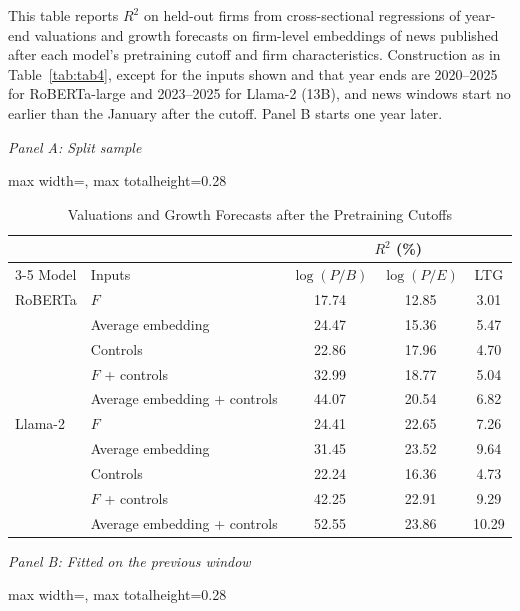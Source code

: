 \begin{table}[htbp]
\centering
\caption{Valuations and Growth Forecasts after the Pretraining Cutoffs}
\label{tab:tabC_post_representation}
\begin{minipage}{\linewidth}\footnotesize
This table reports $R^2$ on held-out firms from cross-sectional regressions of year-end valuations and growth forecasts on firm-level embeddings of news published after each model's pretraining cutoff and firm characteristics. Construction as in Table~\ref{tab:tab4}, except for the inputs shown and that year ends are 2020--2025 for RoBERTa-large and 2023--2025 for Llama-2 (13B), and news windows start no earlier than the January after the cutoff. Panel B starts one year later.
\end{minipage}
\medskip

{\footnotesize
\textit{Panel A: Split sample}\\[2pt]
\begin{adjustbox}{max width=\linewidth, max totalheight=0.28\textheight}
\begin{tabular}{llccc}
\toprule
\multicolumn{2}{c}{} & \multicolumn{3}{c}{$R^2$ (\%)} \\
\cmidrule(lr){3-5}
Model & Inputs & $\log(P/B)$ & $\log(P/E)$ & LTG \\
\midrule
RoBERTa & $F$ & 17.74 & 12.85 & \phantom{0}3.01 \\
 & Average embedding & 24.47 & 15.36 & \phantom{0}5.47 \\
 & Controls & 22.86 & 17.96 & \phantom{0}4.70 \\
 & $F$ + controls & 32.99 & 18.77 & \phantom{0}5.04 \\
 & Average embedding + controls & 44.07 & 20.54 & \phantom{0}6.82 \\
\midrule
Llama-2 & $F$ & 24.41 & 22.65 & \phantom{0}7.26 \\
 & Average embedding & 31.45 & 23.52 & \phantom{0}9.64 \\
 & Controls & 22.24 & 16.36 & \phantom{0}4.73 \\
 & $F$ + controls & 42.25 & 22.91 & \phantom{0}9.29 \\
 & Average embedding + controls & 52.55 & 23.86 & 10.29 \\
\bottomrule
\end{tabular}
\end{adjustbox}
\par\medskip
\textit{Panel B: Fitted on the previous window}\\[2pt]
\begin{adjustbox}{max width=\linewidth, max totalheight=0.28\textheight}

\end{adjustbox}}
\end{table}
